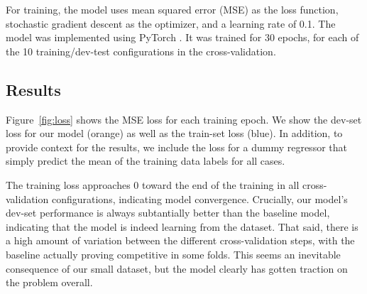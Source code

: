 \documentclass[11pt,a4paper]{article}
\begin{document}
For training, the model uses mean squared error (MSE) as the loss function, stochastic gradient descent as the optimizer, and a learning rate of 0.1. The model was implemented using PyTorch \citep{Paszke:2017}. It was trained for 30 epochs, for each of the 10 training/dev-test configurations in the cross-validation.




\subsection{Results}

Figure~\ref{fig:loss} shows the MSE loss for each training epoch. We show the dev-set loss for our model (orange) as well as the train-set loss (blue). In addition, to provide context for the results, we include the loss for a dummy regressor that simply predict the mean of the training data labels for all cases.

The training loss approaches 0 toward the end of the training in all cross-validation configurations, indicating model convergence. Crucially, our model's dev-set performance is always subtantially better than the baseline model, indicating that the model is indeed learning from the dataset. That said, there is a high amount of variation between the different cross-validation steps, with the baseline actually proving competitive in some folds. This seems an inevitable consequence of our small dataset, but the model clearly has gotten traction on the problem overall.
\end{document}
